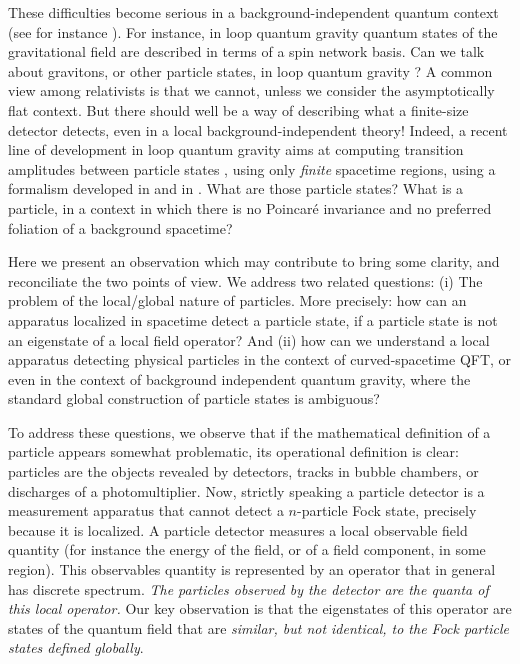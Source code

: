 \documentclass[11pt, nofootinbib]{revtex4-2}
\begin{document}
These difficulties become serious in a background-independent quantum 
context (see for instance \cite{book}). For instance, in loop quantum gravity
\cite{book,lqg}
quantum states of the gravitational field are described in terms of a 
spin network basis. Can we talk about gravitons, or other particle states, 
in loop quantum gravity \cite{gravitons}?  A common view among relativists is that we 
cannot, unless we consider the asymptotically flat context.  But there 
should well be a way of describing what a finite-size 
detector detects, even in a local background-independent theory! 
Indeed, a recent line of development in loop quantum gravity aims at 
computing transition amplitudes between particle states \cite{transitions},
using only {\em finite} spacetime regions, using a formalism 
developed in  \cite{boundary} and in \cite{book}. 
What are those particle states? What is a particle, in a context in which
there is no Poincar\'e invariance and no preferred foliation of a background 
spacetime?

Here we present an observation which may contribute to bring some
clarity, and reconciliate the two points of view.  We address two
related questions: (i) The problem of the local/global nature of
particles.  More precisely: how can an apparatus localized in
spacetime detect a particle state, if a particle state is not an
eigenstate of a local field operator?  And (ii) how can we understand
a local apparatus detecting physical particles in the context of
curved-spacetime QFT, or even in the context of background independent
quantum gravity, where the standard global construction of particle
states is ambiguous?

To address these questions, we observe that if the mathematical
definition of a particle appears somewhat problematic, its operational
definition is clear: particles are the objects revealed by detectors,
tracks in bubble chambers, or discharges of a photomultiplier.  Now,
strictly speaking a particle detector is a measurement apparatus that
cannot detect a $n$-particle Fock state, precisely because it is
localized.  A particle detector measures a local observable field
quantity (for instance the energy of the field, or of a field
component, in some region).  This observables quantity is represented
by an operator that in general has discrete spectrum.  \emph{The
particles observed by the detector are the quanta of this local
operator.} Our key observation is that the eigenstates of this
operator are states of the quantum field that are \emph{similar, but
not identical, to the Fock particle states defined globally}.
\end{document}
